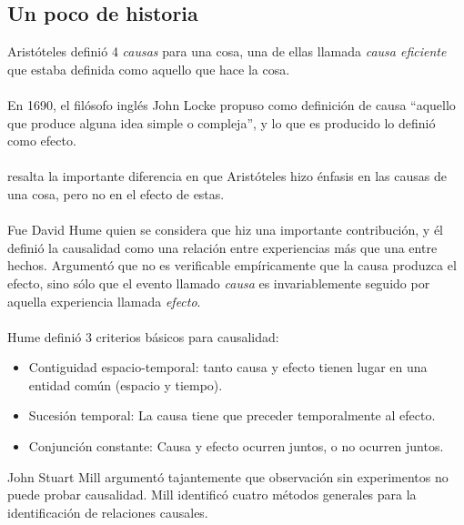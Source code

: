 \documentclass[11pt]{article}
\theoremstyle{plain}
\begin{document}
\subsection{Un poco de historia}
Aristóteles definió 4 \textit{causas} para una cosa, una de ellas llamada \textit{causa eficiente} que estaba definida como aquello que hace la cosa.\\
\\
En 1690, el filósofo inglés John Locke propuso como definición de causa “aquello que produce alguna idea simple o compleja”, y lo que es producido lo definió como efecto.\\
\\
\cite{holland1986statistics} resalta la importante diferencia en que Aristóteles hizo énfasis en las causas de una cosa, pero no en el efecto de estas. \\
\\
Fue David Hume quien se considera que hiz una importante contribución, y él definió la causalidad como una relación entre experiencias más que una entre hechos. Argumentó que no es verificable empíricamente que la causa produzca el efecto, sino sólo que el evento llamado \textit{causa} es invariablemente seguido por aquella experiencia llamada \textit{efecto}.\\
\\
Hume definió 3 criterios básicos para causalidad:
\begin{itemize}
\item Contiguidad espacio-temporal: tanto causa y efecto tienen lugar en una entidad común (espacio y tiempo).
\item Sucesión temporal: La causa tiene que preceder temporalmente al efecto. 
\item Conjunción constante: Causa y efecto ocurren juntos, o no ocurren juntos.
\end{itemize}
John Stuart Mill argumentó tajantemente que observación sin experimentos no puede probar causalidad. Mill identificó cuatro métodos generales para la identificación de relaciones causales. 
\end{document}
